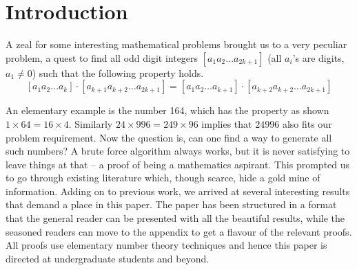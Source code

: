 \documentclass[sn-mathphys]{sn-jnl}%
\theoremstyle{thmstyleone}%
\theoremstyle{thmstyletwo}%
\theoremstyle{thmstylethree}%
\begin{document}
\section{Introduction}\label{sec1}





A zeal for some interesting mathematical problems brought us to a very peculiar problem, a quest to find all odd digit integers $[a_1a_2\ldots a_{2k+1}]$ (all $a_i$'s are digits, $a_1\neq 0$) such that the following property holds.
\[[a_1a_2\ldots a_k]\cdot [a_{k+1}a_{k+2}\ldots a_{2k+1}] = [a_1a_2\ldots a_{k+1}]\cdot [a_{k+2}a_{k+2}\ldots a_{2k+1}]\]

An elementary example is the number 164, which has the property as shown $1\times 64 = 16\times 4$. Similarly $24\times 996 = 249\times 96$ implies that $24996$ also fits our problem requirement. Now the question is, can one find a way to generate all such numbers? A brute force algorithm always works, but it is never satisfying to leave things at that -- a proof of being a mathematics aspirant. This prompted us to go through existing literature which, though scarce, hide a gold mine of information. Adding on to previous work, we arrived at several interesting results that demand a place in this paper. The paper has been structured in a format that the general reader can be presented with all the beautiful results, while the seasoned readers can move to the appendix to get a flavour of the relevant proofs. All proofs use elementary number theory techniques and hence this paper is directed at undergraduate students and beyond. \\
\end{document}
